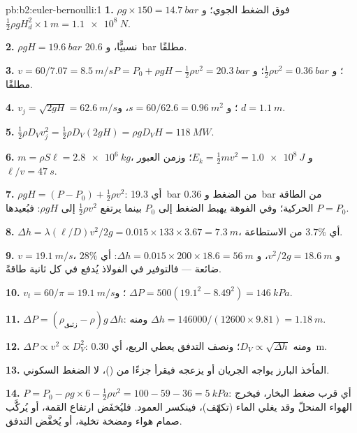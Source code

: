 \begin{solution}{pb:b2:euler-bernoulli:1}
\textbf{1.} $\rho g \times 150 = \qty{14.7}{bar}$ فوق الضغط الجوي؛ و $\tfrac12\rho gH_d^2
\times \qty{1}{m} = \qty{1.1e8}{N}$.

\textbf{2.} $\rho gH = \qty{19.6}{bar}$ نسبيًّا، و \qty{20.6}{bar} مطلقًا.

\textbf{3.} $v = 60/7.07 = \qty{8.5}{m/s}$؛ و $\tfrac12\rho v^2 = \qty{0.36}{bar}$؛ و $P =
P_0 + \rho gH - \tfrac12\rho v^2 = \qty{20.3}{bar}$ مطلقًا.

\textbf{4.} $v_j = \sqrt{2gH} = \qty{62.6}{m/s}$؛ و $s = 60/62.6 = \qty{0.96}{m^2}$، و $d =
\qty{1.1}{m}$.

\textbf{5.} $\tfrac12\rho D_Vv_j^2 = \tfrac12\rho D_V(2gH) = \rho gD_VH = \qty{118}{MW}$.

\textbf{6.} $m = \rho S\ell = \qty{2.8e6}{kg}$، و $E_k = \tfrac12mv^2 = \qty{1.0e8}{J}$؛
وزمن العبور $\ell/v = \qty{47}{s}$.

\textbf{7.} $\rho gH = (P - P_0) + \tfrac12\rho v^2$: أي \qty{19.3}{bar} من الضغط
و \qty{0.36}{bar} من الطاقة الحركية؛ وفي الفوهة يهبط الضغط
إلى $P_0$ بينما يرتفع $\tfrac12\rho v^2$ إلى $\rho gH$: فبُعيدها $P = P_0$.

\textbf{8.} $\Delta h = \lambda(\ell/D)v^2/2g = 0.015 \times 133 \times 3.67 = \qty{7.3}{m}$،
أي $3.7\%$ من الاستطاعة.

\textbf{9.} $v = \qty{19.1}{m/s}$، و $v^2/2g = \qty{18.6}{m}$، و $\Delta h = 0.015 \times 200 \times
18.6 = \qty{56}{m}$: أي $28\%$ ضائعة --- فالتوفير في الفولاذ يُدفع في كل
ثانية طاقةً.

\textbf{10.} $v_t = 60/\pi = \qty{19.1}{m/s}$؛ و $\Delta P = 500(19.1^2 - 8.49^2) =
\qty{146}{kPa}$.

\textbf{11.} $\Delta P = (\rho_{\text{زئبق}} - \rho)g\,\Delta h$: ومنه $\Delta h = 146000/(12600
\times 9.81) = \qty{1.18}{m}$.

\textbf{12.} $\Delta P \propto v^2 \propto D_V^2$: ومنه $D_V \propto \sqrt{\Delta h}$؛ ونصف
التدفق يعطي الربع، أي \qty{0.30}{m}.

\textbf{13.} المأخذ البارز يواجه الجريان أو يزعجه فيقرأ جزءًا من
 ()، لا الضغط السكوني.

\textbf{14.} $P = P_0 - \rho g \times 6 - \tfrac12\rho v^2 = 100 - 59 - 36 = \qty{5}{kPa}$:
أي قرب ضغط البخار، فيخرج الهواء المنحلّ وقد يغلي الماء
(تكهّف)، فينكسر العمود. فليُخفَض ارتفاع القمة، أو يُركَّب صمام
هواء ومضخة تخلية، أو يُخفَّض التدفق.


\end{solution}
